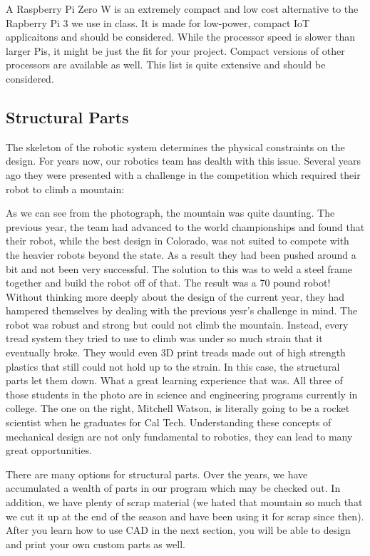 \documentclass[
]{book}
\begin{document}
A Raspberry Pi Zero W is an extremely compact and low cost alternative to the Rapberry Pi 3 we use in class. It is made for low-power, compact IoT applicaitons and should be considered. While the processor speed is slower than larger Pis, it might be just the fit for your project. Compact versions of other processors are available as well. This list is quite extensive and should be considered.

\hypertarget{structural-parts}{%
\subsection{Structural Parts}\label{structural-parts}}

The skeleton of the robotic system determines the physical constraints on the design. For years now, our robotics team has dealth with this issue. Several years ago they were presented with a challenge in the competition which required their robot to climb a mountain:

As we can see from the photograph, the mountain was quite daunting. The previous year, the team had advanced to the world championships and found that their robot, while the best design in Colorado, was not suited to compete with the heavier robots beyond the state. As a result they had been pushed around a bit and not been very successful. The solution to this was to weld a steel frame together and build the robot off of that. The result was a 70 pound robot! Without thinking more deeply about the design of the current year, they had hampered themselves by dealing with the previous yesr's challenge in mind. The robot was robust and strong but could not climb the mountain. Instead, every tread system they tried to use to climb was under so much strain that it eventually broke. They would even 3D print treads made out of high strength plastics that still could not hold up to the strain. In this case, the structural parts let them down. What a great learning experience that was. All three of those students in the photo are in science and engineering programs currently in college. The one on the right, Mitchell Watson, is literally going to be a rocket scientist when he graduates for Cal Tech. Understanding these concepts of mechanical design are not only fundamental to robotics, they can lead to many great opportunities.

There are many options for structural parts. Over the years, we have accumulated a wealth of parts in our program which may be checked out. In addition, we have plenty of scrap material (we hated that mountain so much that we cut it up at the end of the season and have been using it for scrap since then). After you learn how to use CAD in the next section, you will be able to design and print your own custom parts as well.
\end{document}

